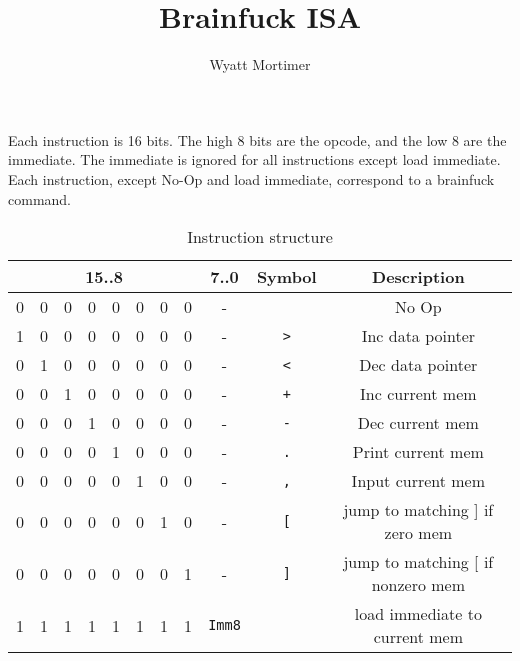\documentclass[12pt]{article}
\title{Brainfuck ISA}
\author{Wyatt Mortimer}
\begin{document}
Each instruction is 16 bits.
The high 8 bits are the opcode, and the low 8 are the immediate.
The immediate is ignored for all instructions except load immediate.
Each instruction, except No-Op and load immediate, correspond to a brainfuck command.

\begin{table}[H]
	\centering
	\caption{Instruction structure}
	\begin{tabular}{|cccccccc|c||c|c|} \hline
		\multicolumn{8}{|c|}{15..8} & {7..0} & Symbol & Description \\ \hline
		0 & 0 & 0 & 0 & 0 & 0 & 0 & 0 & - &             & No Op             \\ \hline
		1 & 0 & 0 & 0 & 0 & 0 & 0 & 0 & - & \texttt{>}  & Inc data pointer  \\ \hline
		0 & 1 & 0 & 0 & 0 & 0 & 0 & 0 & - & \texttt{<}  & Dec data pointer  \\ \hline
		0 & 0 & 1 & 0 & 0 & 0 & 0 & 0 & - & \texttt{+}  & Inc current mem   \\ \hline
		0 & 0 & 0 & 1 & 0 & 0 & 0 & 0 & - & \texttt{-}  & Dec current mem   \\ \hline
		0 & 0 & 0 & 0 & 1 & 0 & 0 & 0 & - & \texttt{.}  & Print current mem \\ \hline
		0 & 0 & 0 & 0 & 0 & 1 & 0 & 0 & - & \texttt{,}  & Input current mem \\ \hline
		0 & 0 & 0 & 0 & 0 & 0 & 1 & 0 & - & \texttt{[}  & jump to matching ] if zero mem \\ \hline
		0 & 0 & 0 & 0 & 0 & 0 & 0 & 1 & - & \texttt{]}  & jump to matching [ if nonzero mem \\ \hline
		1 & 1 & 1 & 1 & 1 & 1 & 1 & 1 & \texttt{Imm8} & & load immediate to current mem \\ \hline
	\end{tabular}
\end{table}
\end{document}
